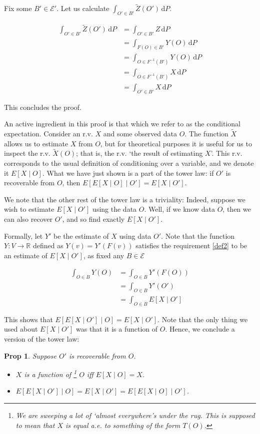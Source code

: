 \documentclass{article}
\let\mathbbalt\mathbb
\let\mathbb\mathbbalt
\newcommand{\E}{\mathcal{E}}
\newcommand{\R}{\mathbb{R}}
\newcommand{\dd}{\,\mathrm{d}}
\newtheorem{prop}{Prop}
\begin{document}
	Fix some $B' \in \E'$. Let us calculate $\int_{O' \in B'} \tilde Z(O') \dd P$.
	
	\begin{align*}
	\int_{O' \in B'} \tilde Z(O') \dd P &= \int_{O' \in B'} Z \dd P\\
	&= \int_{F(O) \in B'} Y(O) \dd P\\
	&= \int_{O \in F^{-1}(B')} Y(O) \dd P\\
	&= \int_{O \in F^{-1}(B')} X \dd P\\
	&= \int_{O' \in B'} X \dd P
	\end{align*}
	
	This concludes the proof.
	
	An active ingredient in this proof is that which we refer to as the conditional expectation. Consider an r.v. $X$ and some observed data $O$. The function $\tilde X$ allows us to estimate $X$ from $O$, but for theoretical purposes it is useful for us to inspect the r.v. $\tilde X(O)$; that is, the r.v. `the result of estimating $X$'. This r.v. corresponds to the usual definition of conditioning over a variable, and we denote it $E[X \mid O]$. What we have just shown is a part of the tower law: if $O'$ is recoverable from $O$, then $E[ E[X \mid O] \mid O'] = E[X \mid O']$.
	
	We note that the other rest of the tower law is a triviality: Indeed, suppose we wish to estimate $E[X \mid O']$ using the data $O$. Well, if we know data $O$, then we can also recover $O'$, and so find exactly $E[X \mid O']$.
	
	Formally, let $Y'$ be the estimate of $X$ using data $O'$. Note that the function $Y : V \to \R$ defined as $Y(v) = Y'(F(v))$ satisfies the requirement \eqref{def2} to be an estimate of $E[X \mid O']$, as fixed any $B \in \E$
	
	\begin{align*}
	\int_{O \in B} Y(O) &= \int_{O \in B} Y'(F(O))\\
	&= \int_{O \in B} Y'(O')\\
	&= \int_{O \in B} E[X \mid O']
	\end{align*}
	
	This shows that $E[E[X \mid O'] \mid O] = E[X \mid O']$. Note that the only thing we used about $E[X \mid O']$ was that it is a function of $O$. Hence, we conclude a version of the tower law:
	
	\begin{prop}
	Suppose $O'$ is recoverable from $O$.
	
	\begin{itemize}
	\item $X$ is a function of \footnote{We are sweeping a lot of `almost everywhere's under the rug. This is supposed to mean that $X$ is equal a.e. to something of the form $T(O)$.} $O$ iff $E[X \mid O] = X$.
	
	\item $E[E[X \mid O'] \mid O] = E[X \mid O'] = E[E[X \mid O] \mid O']$.
	\end{itemize}
	
	\end{prop}
	
\end{document}
